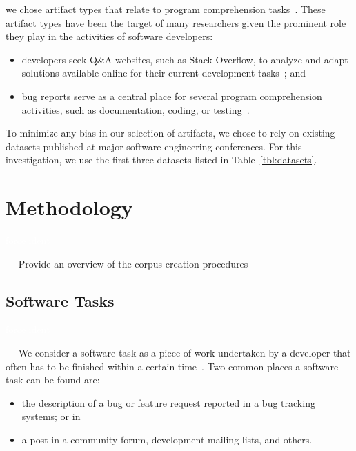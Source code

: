 we chose artifact types that relate to program comprehension tasks~\cite{Li2013, Ponzanelli2017}.
These artifact types have been the target
of many researchers given the prominent role they play in the activities of software developers:

\begin{itemize}
    \item developers seek Q\&A websites, such as Stack Overflow, to analyze and adapt solutions available online for their current development tasks~\cite{Zhang2019, Xia2017, umarji2008archetypal, Brandt2009a, Treude2011a}; and
    \item bug reports serve as a central place for several program comprehension activities, such as documentation, coding, or testing~\cite{Rastkar2010, aranda2009secret, Lotufo2012}.
\end{itemize}


To minimize any bias in our selection of artifacts, we chose to rely on existing datasets published at
major software engineering conferences. For this investigation, we use the
first three  datasets listed in Table~\ref{tbl:datasets}.






\clearpage

\section{Methodology}
\textcolor{white}{force ident} %

--- Provide an overview of the corpus creation procedures 


\subsection{Software Tasks}
\textcolor{white}{force ident} %

--- We consider a software task as a piece of work undertaken by a developer that often has to be finished within a certain time~\cite{2004merriam}. 
Two common places a software task can be found are:

\begin{itemize}
    \item the description of a bug or feature request reported in a bug tracking systems; or in
    \item a post in a community forum, development mailing lists, and others.
\end{itemize}

